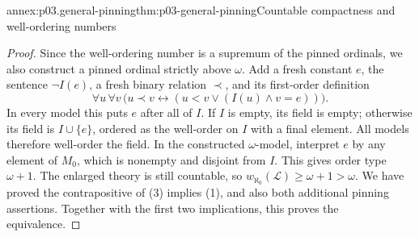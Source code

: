 \begin{annexitem}{annex:p03.general-pinning}{thm:p03-general-pinning}{Countable compactness and well-ordering numbers}
\begin{proof}
Since the well-ordering number is a supremum of the pinned ordinals,
we also construct a pinned ordinal strictly above \(\omega\).
Add a fresh constant \(e\), the sentence \(\neg I(e)\), a fresh
binary relation \(\prec\), and its first-order definition
\[
 \forall u\,\forall v\,
 \bigl(u\prec v\leftrightarrow
       (u<v\lor(I(u)\land v=e))\bigr).
\]
In every model this puts \(e\) after all of \(I\). If \(I\) is empty,
its field is empty; otherwise its field is \(I\cup\{e\}\), ordered
as the well-order on \(I\) with a final element. All models therefore
well-order the field. In the constructed \(\omega\)-model, interpret
\(e\) by any element of \(M_0\), which is nonempty and disjoint from
\(I\). This gives order type \(\omega+1\).
The enlarged theory is still countable, so
\(w_{\aleph_0}(\mathscr L)\geq\omega+1>\omega\).
We have proved the contrapositive of (3) implies (1), and also both
additional pinning assertions. Together with the first two implications,
this proves the equivalence.
\end{proof}
\end{annexitem}
